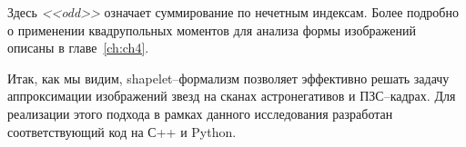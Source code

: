 Здесь \textit{<<odd>>} означает суммирование по нечетным индексам.
Более подробно о применении квадрупольных моментов для анализа формы изображений описаны в главе~\ref{ch:ch4}.

Итак, как мы видим, shapelet--формализм позволяет эффективно решать задачу аппроксимации изображений звезд на сканах астронегативов и ПЗС--кадрах. Для реализации этого подхода в рамках данного исследования разработан соответствующий код на С++ и Python.
